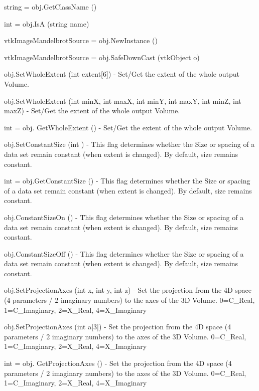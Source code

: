 \begin{DoxyItemize}
\item {\ttfamily string = obj.\-Get\-Class\-Name ()}  
\item {\ttfamily int = obj.\-Is\-A (string name)}  
\item {\ttfamily vtk\-Image\-Mandelbrot\-Source = obj.\-New\-Instance ()}  
\item {\ttfamily vtk\-Image\-Mandelbrot\-Source = obj.\-Safe\-Down\-Cast (vtk\-Object o)}  
\item {\ttfamily obj.\-Set\-Whole\-Extent (int extent\mbox{[}6\mbox{]})} -\/ Set/\-Get the extent of the whole output Volume.  
\item {\ttfamily obj.\-Set\-Whole\-Extent (int min\-X, int max\-X, int min\-Y, int max\-Y, int min\-Z, int max\-Z)} -\/ Set/\-Get the extent of the whole output Volume.  
\item {\ttfamily int = obj. Get\-Whole\-Extent ()} -\/ Set/\-Get the extent of the whole output Volume.  
\item {\ttfamily obj.\-Set\-Constant\-Size (int )} -\/ This flag determines whether the Size or spacing of a data set remain constant (when extent is changed). By default, size remains constant.  
\item {\ttfamily int = obj.\-Get\-Constant\-Size ()} -\/ This flag determines whether the Size or spacing of a data set remain constant (when extent is changed). By default, size remains constant.  
\item {\ttfamily obj.\-Constant\-Size\-On ()} -\/ This flag determines whether the Size or spacing of a data set remain constant (when extent is changed). By default, size remains constant.  
\item {\ttfamily obj.\-Constant\-Size\-Off ()} -\/ This flag determines whether the Size or spacing of a data set remain constant (when extent is changed). By default, size remains constant.  
\item {\ttfamily obj.\-Set\-Projection\-Axes (int x, int y, int z)} -\/ Set the projection from the 4\-D space (4 parameters / 2 imaginary numbers) to the axes of the 3\-D Volume. 0=C\-\_\-\-Real, 1=C\-\_\-\-Imaginary, 2=X\-\_\-\-Real, 4=X\-\_\-\-Imaginary  
\item {\ttfamily obj.\-Set\-Projection\-Axes (int a\mbox{[}3\mbox{]})} -\/ Set the projection from the 4\-D space (4 parameters / 2 imaginary numbers) to the axes of the 3\-D Volume. 0=C\-\_\-\-Real, 1=C\-\_\-\-Imaginary, 2=X\-\_\-\-Real, 4=X\-\_\-\-Imaginary  
\item {\ttfamily int = obj. Get\-Projection\-Axes ()} -\/ Set the projection from the 4\-D space (4 parameters / 2 imaginary numbers) to the axes of the 3\-D Volume. 0=C\-\_\-\-Real, 1=C\-\_\-\-Imaginary, 2=X\-\_\-\-Real, 4=X\-\_\-\-Imaginary  

\end{DoxyItemize}
